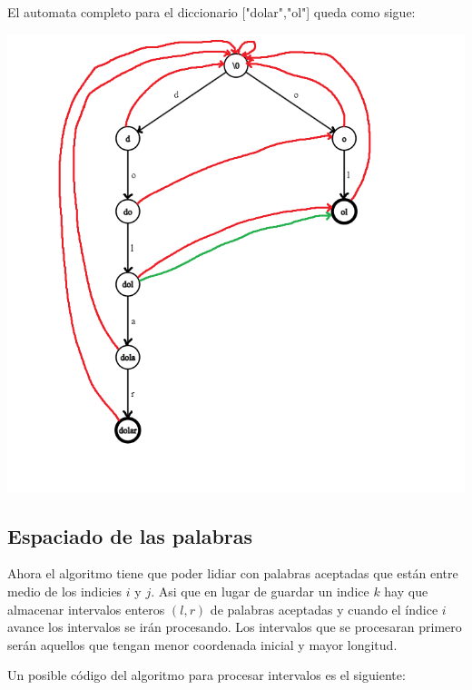 \documentclass{article}
\begin{document}
El automata completo para el diccionario ["dolar","ol"] queda como sigue:

\begin{center}
\includegraphics[scale=0.3]{Imagenes/automata_completo_dolar_ol.png}
\end{center}

\subsection*{Espaciado de las palabras}

Ahora el algoritmo tiene que poder lidiar con palabras aceptadas que están entre medio de los indicies $i$ y $j$. Asi que en lugar de guardar un indice $k$ hay que almacenar intervalos enteros $(l,r)$ de palabras
aceptadas y cuando el índice $i$ avance los intervalos se irán procesando. Los intervalos que se procesaran primero serán aquellos que tengan menor coordenada inicial y mayor longitud.

Un posible código del algoritmo para procesar intervalos es el siguiente:
\end{document}
